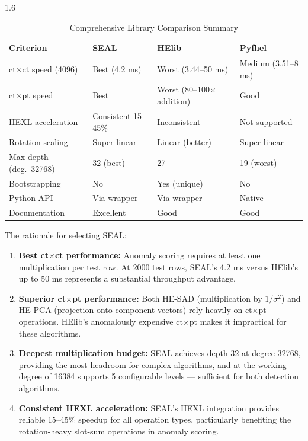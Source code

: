 \begin{spacing}{1.6}
\begin{table}[H]
\centering
\caption{Comprehensive Library Comparison Summary}
\label{tab:libsummary}
\begin{tabular}{p{4cm}p{3cm}p{3cm}p{3cm}}
\toprule
\textbf{Criterion} & \textbf{SEAL} & \textbf{HElib} & \textbf{Pyfhel} \\
\midrule
ct$\times$ct speed (4096) & Best (4.2 ms) & Worst (3.44--50 ms) & Medium (3.51--8 ms) \\
ct$\times$pt speed & Best & Worst (80--100$\times$ addition) & Good \\
HEXL acceleration & Consistent 15--45\% & Inconsistent & Not supported \\
Rotation scaling & Super-linear & Linear (better) & Super-linear \\
Max depth (deg.\ 32768) & 32 (best) & 27 & 19 (worst) \\
Bootstrapping & No & Yes (unique) & No \\
Python API & Via wrapper & Via wrapper & Native \\
Documentation & Excellent & Good & Good \\
\bottomrule
\end{tabular}
\end{table}

The rationale for selecting SEAL:

\begin{enumerate}
  \item \textbf{Best ct$\times$ct performance:} Anomaly scoring requires at
  least one multiplication per test row. At 2000 test rows, SEAL's 4.2 ms
  versus HElib's up to 50 ms represents a substantial throughput advantage.

  \item \textbf{Superior ct$\times$pt performance:} Both HE-SAD
  (multiplication by $1/\sigma^2$) and HE-PCA (projection onto component
  vectors) rely heavily on ct$\times$pt operations. HElib's anomalously
  expensive ct$\times$pt makes it impractical for these algorithms.

  \item \textbf{Deepest multiplication budget:} SEAL achieves depth 32 at
  degree 32768, providing the most headroom for complex algorithms, and at the
  working degree of 16384 supports 5 configurable levels --- sufficient for
  both detection algorithms.

  \item \textbf{Consistent HEXL acceleration:} SEAL's HEXL integration provides
  reliable 15--45\% speedup for all operation types, particularly benefiting
  the rotation-heavy slot-sum operations in anomaly scoring.
\end{enumerate}


\end{spacing}
